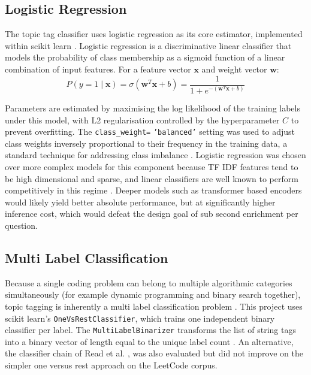 \subsection{Logistic Regression}

The topic tag classifier uses logistic regression as its core estimator,
implemented within scikit learn \cite{pedregosa2011,buitinck2013api}.
Logistic regression is a discriminative linear classifier that models
the probability of class membership as a sigmoid function of a linear
combination of input features. For a feature vector $\mathbf{x}$ and
weight vector $\mathbf{w}$:
\[
P(y = 1 \mid \mathbf{x}) = \sigma(\mathbf{w}^T \mathbf{x} + b) = \frac{1}{1 + e^{-(\mathbf{w}^T \mathbf{x} + b)}}
\]

Parameters are estimated by maximising the log likelihood of the training
labels under this model, with L2 regularisation controlled by the
hyperparameter $C$ to prevent overfitting. The \texttt{class\_weight=}
\texttt{'balanced'} setting was used to adjust class weights inversely
proportional to their frequency in the training data, a standard
technique for addressing class imbalance \cite{japkowicz2002imbalance}.
Logistic regression was chosen over more complex models for this
component because TF IDF features tend to be high dimensional and
sparse, and linear classifiers are well known to perform competitively
in this regime \cite{hastie2009esl}. Deeper models such as transformer
based encoders would likely yield better absolute performance, but at
significantly higher inference cost, which would defeat the design goal
of sub second enrichment per question.

\subsection{Multi Label Classification}

Because a single coding problem can belong to multiple algorithmic
categories simultaneously (for example dynamic programming and binary
search together), topic tagging is inherently a multi label
classification problem \cite{zhang2014multilabel}. This project uses
scikit learn's \texttt{OneVsRestClassifier}, which trains one
independent binary classifier per label. The \texttt{MultiLabelBinarizer}
transforms the list of string tags into a binary vector of length
equal to the unique label count \cite{pedregosa2011}. An alternative,
the classifier chain of Read et al. \cite{read2011classifierchains},
was also evaluated but did not improve on the simpler one versus rest
approach on the LeetCode corpus.

